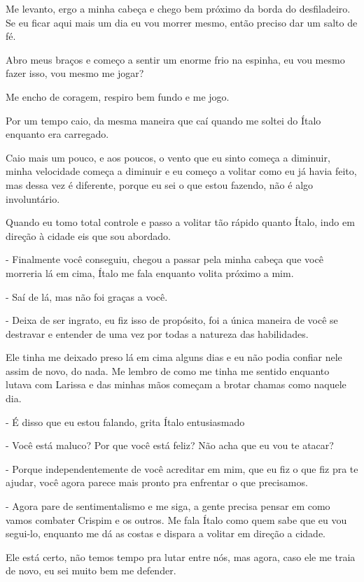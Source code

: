 Me levanto, ergo a minha cabeça e chego bem próximo da borda do desfiladeiro. Se eu ficar aqui mais um dia eu vou morrer mesmo, então preciso dar um salto de fé.

Abro meus braços e começo a sentir um enorme frio na espinha, eu vou mesmo fazer isso, vou mesmo me jogar?

Me encho de coragem, respiro bem fundo e me jogo.

Por um tempo caio, da mesma maneira que caí quando me soltei do Ítalo enquanto era carregado.

Caio mais um pouco, e aos poucos, o vento que eu sinto começa a diminuir, minha velocidade começa a diminuir e eu começo a volitar como eu já havia feito, mas dessa vez é diferente, porque eu sei o que estou fazendo, não é algo involuntário.

Quando eu tomo total controle e passo a volitar tão rápido quanto Ítalo, indo em direção à cidade eis que sou abordado.

- Finalmente você conseguiu, chegou a passar pela minha cabeça que você morreria lá em cima, Ítalo me fala enquanto volita próximo a mim.

- Saí de lá, mas não foi graças a você.

- Deixa de ser ingrato, eu fiz isso de propósito, foi a única maneira de você se destravar e entender de uma vez por todas a natureza das habilidades.

Ele tinha me deixado preso lá em cima alguns dias e eu não podia confiar nele assim de novo, do nada. Me lembro de como me tinha me sentido enquanto lutava com Larissa e das minhas mãos começam a brotar chamas como naquele dia.

- É disso que eu estou falando, grita Ítalo entusiasmado

- Você está maluco? Por que você está feliz? Não acha que eu vou te atacar?

- Porque independentemente de você acreditar em mim, que eu fiz o que fiz pra te ajudar, você agora parece mais pronto pra enfrentar o que precisamos.

- Agora pare de sentimentalismo e me siga, a gente precisa pensar em como vamos combater Crispim e os outros. Me fala Ítalo como quem sabe que eu vou segui-lo, enquanto me dá as costas e dispara a volitar em direção a cidade.

Ele está certo, não temos tempo pra lutar entre nós, mas agora, caso ele me traia de novo, eu sei muito bem me defender.

